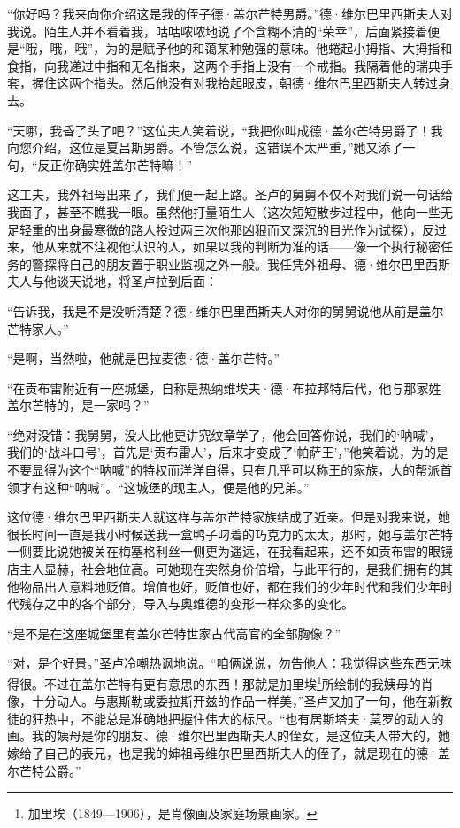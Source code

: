 \par “你好吗？我来向你介绍这是我的侄子德·盖尔芒特男爵。”德·维尔巴里西斯夫人对我说。陌生人并不看着我，咕咕哝哝地说了个含糊不清的“荣幸”，后面紧接着便是“哦，哦，哦”，为的是赋予他的和蔼某种勉强的意味。他蜷起小拇指、大拇指和食指，向我递过中指和无名指来，这两个手指上没有一个戒指。我隔着他的瑞典手套，握住这两个指头。然后他没有对我抬起眼皮，朝德·维尔巴里西斯夫人转过身去。
\par “天哪，我昏了头了吧？”这位夫人笑着说，“我把你叫成德·盖尔芒特男爵了！我向您介绍，这位是夏吕斯男爵。不管怎么说，这错误不太严重，”她又添了一句，“反正你确实姓盖尔芒特嘛！”
\par 这工夫，我外祖母出来了，我们便一起上路。圣卢的舅舅不仅不对我们说一句话给我面子，甚至不瞧我一眼。虽然他打量陌生人（这次短短散步过程中，他向一些无足轻重的出身最寒微的路人投过两三次他那凶狠而又深沉的目光作为试探），反过来，他从来就不注视他认识的人，如果以我的判断为准的话——像一个执行秘密任务的警探将自己的朋友置于职业监视之外一般。我任凭外祖母、德·维尔巴里西斯夫人与他谈天说地，将圣卢拉到后面：
\par “告诉我，我是不是没听清楚？德·维尔巴里西斯夫人对你的舅舅说他从前是盖尔芒特家人。”
\par “是啊，当然啦，他就是巴拉麦德·德·盖尔芒特。”
\par “在贡布雷附近有一座城堡，自称是热纳维埃夫·德·布拉邦特后代，他与那家姓盖尔芒特的，是一家吗？”
\par “绝对没错：我舅舅，没人比他更讲究纹章学了，他会回答你说，我们的‘呐喊’，我们的‘战斗口号’，首先是‘贡布雷人’，后来才变成了‘帕萨王’，”他笑着说，为的是不要显得为这个“呐喊”的特权而洋洋自得，只有几乎可以称王的家族，大的帮派首领才有这种“呐喊”。“这城堡的现主人，便是他的兄弟。”
\par 这位德·维尔巴里西斯夫人就这样与盖尔芒特家族结成了近亲。但是对我来说，她很长时间一直是我小时候送我一盒鸭子叼着的巧克力的太太，那时，她与盖尔芒特一侧要比说她被关在梅塞格利丝一侧更为遥远，在我看起来，还不如贡布雷的眼镜店主人显赫，社会地位高。可她现在突然身价倍增，与此平行的，是我们拥有的其他物品出人意料地贬值。增值也好，贬值也好，都在我们的少年时代和我们少年时代残存之中的各个部分，导入与奥维德的变形一样众多的变化。
\par “是不是在这座城堡里有盖尔芒特世家古代高官的全部胸像？”
\par “对，是个好景。”圣卢冷嘲热讽地说。“咱俩说说，勿告他人：我觉得这些东西无味得很。不过在盖尔芒特有更有意思的东西！那就是加里埃\footnote{加里埃（1849—1906），是肖像画及家庭场景画家。}所绘制的我姨母的肖像，十分动人。与惠斯勒或委拉斯开兹的作品一样美，”圣卢又加了一句，他在新教徒的狂热中，不能总是准确地把握住伟大的标尺。“也有居斯塔夫·莫罗的动人的画。我的姨母是你的朋友、德·维尔巴里西斯夫人的侄女，是这位夫人带大的，她嫁给了自己的表兄，也是我的婶祖母维尔巴里西斯夫人的侄子，就是现在的德·盖尔芒特公爵。”
